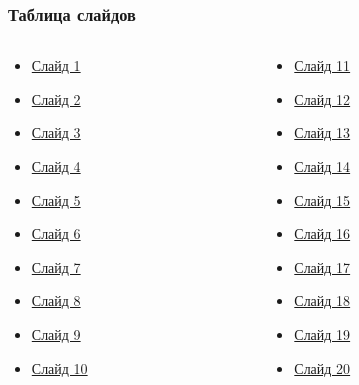 \begin{frame}[label=tableslide,noframenumbering,plain] %
\frametitle{Таблица слайдов} %

\begin{columns}[T] %
	
	\begin{column}{0.2\textwidth} %
		\begin{itemize}
			\item \hyperlink{slide1}{Слайд 1} %
			\item \hyperlink{slide2}{Слайд 2} %
			\item \hyperlink{slide3}{Слайд 3} %
			\item \hyperlink{slide4}{Слайд 4} %
			\item \hyperlink{slide5}{Слайд 5} %
			\item \hyperlink{slide6}{Слайд 6} %
			\item \hyperlink{slide7}{Слайд 7} %
			\item \hyperlink{slide8}{Слайд 8} %
			\item \hyperlink{slide9}{Слайд 9} %
			\item \hyperlink{slide10}{Слайд 10} %
		\end{itemize}
	\end{column}
	
	\begin{column}{0.2\textwidth} %
		\begin{itemize}
			\item \hyperlink{slide11}{Слайд 11} %
			\item \hyperlink{slide12}{Слайд 12} %
			\item \hyperlink{slide13}{Слайд 13} %
			\item \hyperlink{slide14}{Слайд 14} %
			\item \hyperlink{slide15}{Слайд 15} %
			\item \hyperlink{slide16}{Слайд 16} %
			\item \hyperlink{slide17}{Слайд 17} %
			\item \hyperlink{slide18}{Слайд 18} %
			\item \hyperlink{slide19}{Слайд 19} %
			\item \hyperlink{slide20}{Слайд 20} %
		\end{itemize}
	\end{column}
	

\end{columns}
\end{frame}
